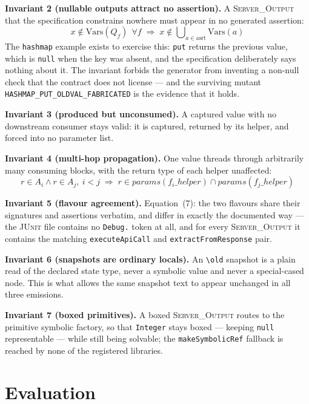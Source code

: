 \documentclass[conference]{IEEEtran}
\begin{document}
\textbf{Invariant 2 (nullable outputs attract no assertion).} A
\textsc{Server\_Output} that the specification constrains nowhere must appear in no
generated assertion:
\begin{equation}
x\notin \mathrm{Vars}(Q_f)\ \ \forall f \;\Rightarrow\; x\notin\bigcup\nolimits_{a\in\mathrm{asrt}}\mathrm{Vars}(a)
\end{equation}
The \texttt{hashmap} example exists to exercise this: \texttt{put} returns the
previous value, which is \texttt{null} when the key was absent, and the
specification deliberately says nothing about it. The invariant forbids the
generator from inventing a non-null check that the contract does not license --- and
the surviving mutant \texttt{HASHMAP\_PUT\_OLDVAL\_FABRICATED} is the evidence that
it holds.

\textbf{Invariant 3 (produced but unconsumed).} A captured value with no downstream
consumer stays valid: it is captured, returned by its helper, and forced into no
parameter list.

\textbf{Invariant 4 (multi-hop propagation).} One value threads through arbitrarily
many consuming blocks, with the return type of each helper unaffected:
\begin{equation}
r\in A_i \wedge r\in A_j,\ i<j \;\Rightarrow\; r\in\mathit{params}(f_i\_\mathit{helper})\cap\mathit{params}(f_j\_\mathit{helper})
\end{equation}

\textbf{Invariant 5 (flavour agreement).} Equation~(7): the two flavours share their
signatures and assertions verbatim, and differ in exactly the documented way --- the
\textsc{JUnit} file contains no \texttt{Debug.} token at all, and for every
\textsc{Server\_Output} it contains the matching \texttt{executeApiCall} and
\texttt{extractFromResponse} pair.

\textbf{Invariant 6 (snapshots are ordinary locals).} An \texttt{\textbackslash old}
snapshot is a plain read of the declared state type, never a symbolic value and never
a special-cased node. This is what allows the same snapshot text to appear unchanged
in all three emissions.

\textbf{Invariant 7 (boxed primitives).} A boxed \textsc{Server\_Output} routes to the
primitive symbolic factory, so that \texttt{Integer} stays boxed --- keeping
\texttt{null} representable --- while still being solvable; the
\texttt{makeSymbolicRef} fallback is reached by none of the registered libraries.

\section{Evaluation}
\label{sec:eval}
\end{document}
